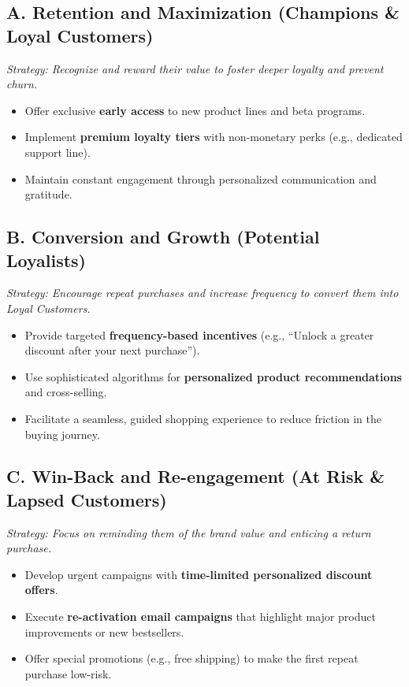 \documentclass{article}
\begin{document}
\subsection*{A. Retention and Maximization (Champions \& Loyal Customers)}
\emph{Strategy: Recognize and reward their value to foster deeper loyalty and prevent churn.}
\begin{itemize}
    \item Offer exclusive \textbf{early access} to new product lines and beta programs.
    \item Implement \textbf{premium loyalty tiers} with non-monetary perks (e.g., dedicated support line).
    \item Maintain constant engagement through personalized communication and gratitude.
\end{itemize}

\subsection*{B. Conversion and Growth (Potential Loyalists)}
\emph{Strategy: Encourage repeat purchases and increase frequency to convert them into Loyal Customers.}
\begin{itemize}
    \item Provide targeted \textbf{frequency-based incentives} (e.g., ``Unlock a greater discount after your next purchase'').
    \item Use sophisticated algorithms for \textbf{personalized product recommendations} and cross-selling.
    \item Facilitate a seamless, guided shopping experience to reduce friction in the buying journey.
\end{itemize}

\subsection*{C. Win-Back and Re-engagement (At Risk \& Lapsed Customers)}
\emph{Strategy: Focus on reminding them of the brand value and enticing a return purchase.}
\begin{itemize}
    \item Develop urgent campaigns with \textbf{time-limited personalized discount offers}.
    \item Execute \textbf{re-activation email campaigns} that highlight major product improvements or new bestsellers.
    \item Offer special promotions (e.g., free shipping) to make the first repeat purchase low-risk.
\end{itemize}
\end{document}

